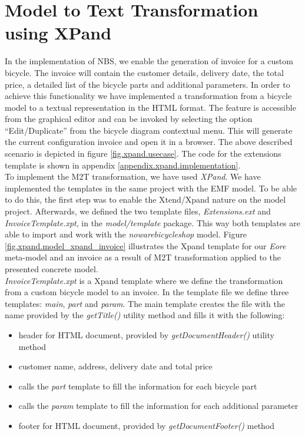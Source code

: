 \section{Model to Text Transformation using XPand}
\label{sec.m2t}
\noindent In the implementation of NBS, we enable the generation of invoice for
a custom bicycle. The invoice will contain the customer details, delivery date,
the total price, a detailed list of the bicycle parts and additional parameters.
In order to achieve this functionality we have implemented a transformation from
a bicycle model to a textual representation in the HTML format. The feature is
accessible from the graphical editor and can be invoked by selecting the option
``Edit/Duplicate'' from the bicycle diagram contextual menu. This will generate
the current configuration invoice and open it in a browser. The above described
scenario is depicted in figure \ref{fig.xpand.usecase}. The code for the
extensions template is shown in appendix
\ref{appendix.xpand.implementation}.\\


\noindent To implement the M2T transformation, we have used \emph{XPand}. We
have implemented the templates in the same project with the EMF model. To be able to
do this, the first step was to enable the Xtend/Xpand nature on the model
project. Afterwards, we defined the two template files, \emph{Extensions.ext}
and \emph{InvoiceTemplate.xpt}, in the \emph{model/template} package. This way
both templates are able to import and work with the \emph{nowarebicycleshop}
model. Figure \ref{fig.xpand.model_xpand_invoice} illustrates the Xpand template
for our \emph{Eore} meta-model and an invoice as a result of M2T transformation
applied to the presented concrete model.\\

\noindent \emph{InvoiceTemplate.xpt} is a Xpand template where we define the
transformation from a custom bicycle model to an invoice. In the template file
we define three templates: \emph{main}, \emph{part} and \emph{param}. The main
template creates the file with the name provided by the \emph{getTitle()}
utility method and fills it with the following:
\begin{itemize}
  \item header for HTML document, provided by \emph{getDocumentHeader()}
  utility method
  \item customer name, address, delivery date and total price
  \item calls the \emph{part} template to fill the information for each bicycle
  part
  \item calls the \emph{param} template to fill the information for each
  additional parameter
  \item footer for HTML document, provided by \emph{getDocumentFooter()}
  method\\
\end{itemize}

